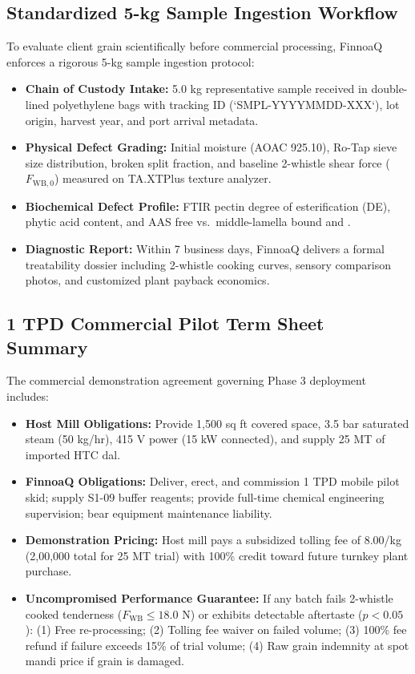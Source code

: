 \documentclass[10pt,a4paper]{article}
\newcommand{\inr}{\text{INR~}}
\begin{document}
\subsection{Standardized 5-kg Sample Ingestion Workflow}
To evaluate client grain scientifically before commercial processing, FinnoaQ enforces a rigorous 5-kg sample ingestion protocol:
\begin{itemize}[leftmargin=*]
    \item \textbf{Chain of Custody Intake:} 5.0 kg representative sample received in double-lined polyethylene bags with tracking ID (`SMPL-YYYYMMDD-XXX`), lot origin, harvest year, and port arrival metadata.
    \item \textbf{Physical Defect Grading:} Initial moisture (AOAC 925.10), Ro-Tap sieve size distribution, broken split fraction, and baseline 2-whistle shear force ($F_{\text{WB},0}$) measured on TA.XTPlus texture analyzer.
    \item \textbf{Biochemical Defect Profile:} FTIR pectin degree of esterification (DE), phytic acid content, and AAS free vs.\ middle-lamella bound  and .
    \item \textbf{Diagnostic Report:} Within 7 business days, FinnoaQ delivers a formal treatability dossier including 2-whistle cooking curves, sensory comparison photos, and customized plant payback economics.
\end{itemize}

\subsection{1 TPD Commercial Pilot Term Sheet Summary}
The commercial demonstration agreement governing Phase 3 deployment includes:
\begin{itemize}[leftmargin=*]
    \item \textbf{Host Mill Obligations:} Provide 1,500 sq ft covered space, 3.5 bar saturated steam (50 kg/hr), 415 V power (15 kW connected), and supply 25 MT of imported HTC dal.
    \item \textbf{FinnoaQ Obligations:} Deliver, erect, and commission 1 TPD mobile pilot skid; supply S1-09 buffer reagents; provide full-time chemical engineering supervision; bear equipment maintenance liability.
    \item \textbf{Demonstration Pricing:} Host mill pays a subsidized tolling fee of \inr 8.00/kg (\inr 2,00,000 total for 25 MT trial) with 100\% credit toward future turnkey plant purchase.
    \item \textbf{Uncompromised Performance Guarantee:} If any batch fails 2-whistle cooked tenderness ($F_{\text{WB}} \le 18.0\text{ N}$) or exhibits detectable aftertaste ($p < 0.05$): (1) Free re-processing; (2) Tolling fee waiver on failed volume; (3) 100\% fee refund if failure exceeds 15\% of trial volume; (4) Raw grain indemnity at spot mandi price if grain is damaged.
\end{itemize}
\end{document}
